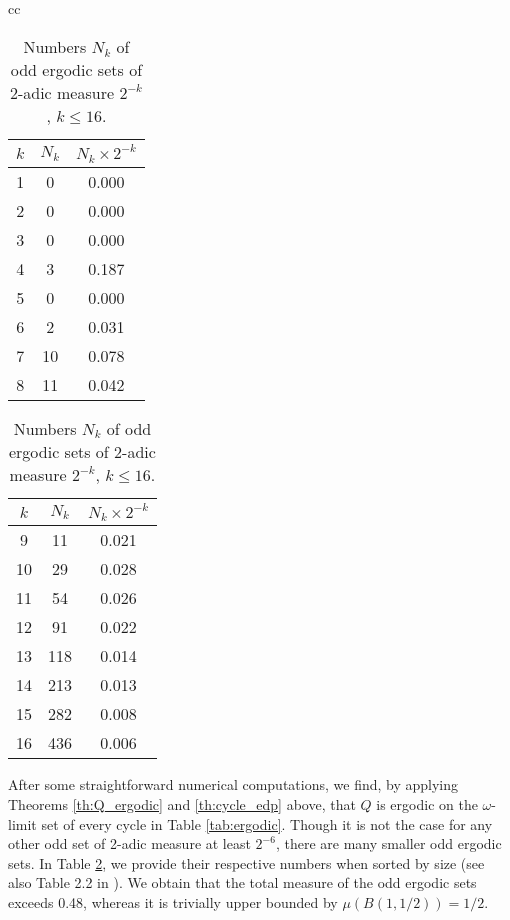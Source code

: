 \documentclass[12pt]{article}
\theoremstyle{definition}
\begin{document}
{\begin{table}
\caption{Numbers $N_k$ of odd ergodic sets of 2-adic measure $2^{-k}$, $k \leq 16$.}
\label{tab:nb_ergodic}
\begin{center}
\begin{tabular}{cc}
\begin{tabular}{|c|c|c|}
\hline
$k$ & $N_k$ & $N_k \times 2^{-k}$  \\
\hline
\hline
1 & 0 & 0.000 \\
\hline
2 & 0 & 0.000 \\
\hline
3 & 0 & 0.000 \\
\hline
4 & 3 & 0.187 \\
\hline
5 & 0 & 0.000 \\
\hline
6 & 2 & 0.031 \\
\hline
7 & 10 & 0.078 \\
\hline
8 & 11 & 0.042 \\
\hline
\end{tabular}

\begin{tabular}{|c|c|c|}
\hline
$k$ & $N_k$ & $N_k \times 2^{-k}$  \\
\hline
\hline
9 & 11 & 0.021 \\
\hline
10 & 29 & 0.028 \\
\hline
11 & 54 & 0.026 \\
\hline
12 & 91 & 0.022 \\
\hline
13 & 118 & 0.014 \\
\hline
14 & 213 & 0.013 \\
\hline
15 & 282 & 0.008 \\
\hline
16 & 436 & 0.006 \\
\hline
\end{tabular}

\end{tabular}
\end{center}
\end{table}

After some straightforward numerical computations, we find, by applying Theorems \ref{th:Q_ergodic} and \ref{th:cycle_edp} above, that $Q$ is ergodic on the $\omega$-limit set of every cycle in Table \ref{tab:ergodic}. Though it is not the case for any other odd set of 2-adic measure at least $2^{-6}$, there are many smaller odd ergodic sets. In Table \ref{tab:nb_ergodic}, we provide their respective numbers when sorted by size (see also Table 2.2 in \cite{Ber96}). We obtain that the total measure of the odd ergodic sets exceeds 0.48, whereas it is trivially upper bounded by $\mu \left(B(1, 1/2) \right) = 1/2$.

}
\end{document}
